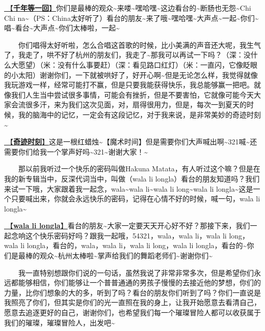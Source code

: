 \documentclass[]{ctexbook}
\begin{document}
\hyperref[once-in-1000]{🎵【\textbf{千年等一回}】}你们是最棒的观众\textasciitilde 来喽\textasciitilde 嘿哈嘿\textasciitilde 这边看台的\textasciitilde 断肠也无怨\textasciitilde Chi Chi na\textasciitilde（PS：China太好听了）看台的朋友\textasciitilde 来了哦\textasciitilde 嘿哈嘿\textasciitilde 大声点\textasciitilde 一起\textasciitilde 你们\textasciitilde 唱\textasciitilde 看台\textasciitilde 大声点\textasciitilde 你们太棒啦，一起\textasciitilde{}

  你们唱得太好听啦，怎么合唱这首歌的时候，比小美满的声音还大呢，我生气了，我走了，哄不好了杭州的朋友们，我走了\textasciitilde 那我可以再试一下吗？（深：没什么大愿望）（米：没有什么事要赶）（深：看见路口红灯）（米：一直闪，它像眨眼的小太阳）谢谢你们，一下就被哄好了，好开心啊\textasciitilde 但是无论怎么样，我觉得就像我玩游戏一样，经常可能打不赢，但是只要我能获得快乐，我总能够赢一把吧。就像我们人生当中尝试很多事情，可能会有挫折，但是不要害怕，它就像可能今天大家会流很多汗，来为我们这次见面，对，扇得很用力，但是，每次一到夏天的时候，我的脑海中的记忆，一定会有这段记忆，对于我来说，是非常美妙的奇迹时刻\textasciitilde{}

\hyperref[magic-moment]{🎵【\textbf{奇迹时刻}】}这是一根红蜡烛\textasciitilde【魔术时间】但是需要你们大声喊出啊\textasciitilde321喊\textasciitilde 还需要你们给我一个掌声好吗\textasciitilde321\textasciitilde 谢谢大家！\textasciitilde{}

  那以前我听过一个快乐的密码叫做Hakuna Matata，有人听过这个嘛？但是在我的新专辑当中，反深代词当中，叫做（wala li longla）看台的朋友知道吗？我们来试一下哦，大家跟着我一起念，wala\textasciitilde wala li\textasciitilde wala li long\textasciitilde wala li longla\textasciitilde 这是一个只要喊出来，你就会永远快乐的密码，记得在心情不好的时候，喊一句，wala li longla\textasciitilde{}

\hyperref[wala-li-longla]{🎵【\textbf{wala li longla}】}看台的朋友\textasciitilde 大家一定要天天开心好不好？那接下来，我们一起念响这个快乐密码好吗？跟我一起哦，54321，wala，wala li，wala li long，wala li longla，看台的，wala，wala li，wala li long，wala li longla，看台的\textasciitilde 你们是最棒的观众\textasciitilde 杭州太棒啦\textasciitilde 掌声给我们的舞蹈老师们\textasciitilde 谢谢你们\textasciitilde{}

  我一直特别想跟你们说的一句话，虽然我说了非常非常多次，但是希望你们永远都能够相信，你们能够让一个普普通通的男孩子慢慢的去接近他的梦想，你们的力量，比你们想象的大的多，听到了吗？看台的朋友你们听到了吗？你们一直说是我照亮了你们，但其实是你们的光一直照在我的身上，让我开始愿意去看清自己，愿意去追逐更好的自己，谢谢你们，也希望我们每一个璀璨冒险人都可以收获属于我们的璀璨，璀璨冒险人，出发吧\textasciitilde{}
\end{document}
